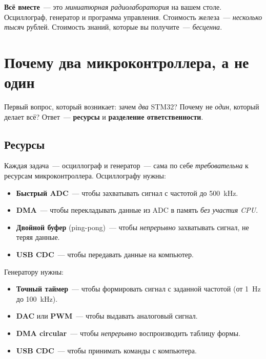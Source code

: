 \begin{keybox}
\textbf{Всё вместе}~--- это \emph{миниатюрная радиолаборатория}
на вашем столе. Осциллограф, генератор и программа
управления. Стоимость железа~--- \emph{несколько тысяч}
рублей. Стоимость знаний, которые вы получите~--- \emph{бесценна}.
\end{keybox}

\section{Почему два микроконтроллера, а не один}
\label{sec:intro-two-mcu}

Первый вопрос, который возникает: зачем \emph{два} STM32?
Почему не \emph{один}, который делает всё? Ответ~---
\textbf{ресурсы} и \textbf{разделение ответственности}.

\subsection{Ресурсы}

Каждая задача~--- осциллограф и генератор~---
сама по себе \emph{требовательна} к ресурсам микроконтроллера.
Осциллографу нужны:

\begin{itemize}
    \item \textbf{Быстрый ADC}~--- чтобы захватывать сигнал
          с частотой до \SI{500}{\kilo\hertz}.
    \item \textbf{DMA}~--- чтобы перекладывать данные из ADC
          в память \emph{без участия CPU}.
    \item \textbf{Двойной буфер} (ping-pong)~--- чтобы
          \emph{непрерывно} захватывать сигнал, не теряя данные.
    \item \textbf{USB CDC}~--- чтобы передавать данные
          на компьютер.
\end{itemize}

Генератору нужны:

\begin{itemize}
    \item \textbf{Точный таймер}~--- чтобы формировать сигнал
          с заданной частотой (от \SI{1}{\hertz} до \SI{100}{\kilo\hertz}).
    \item \textbf{DAC} или \textbf{PWM}~--- чтобы выдавать
          аналоговый сигнал.
    \item \textbf{DMA circular}~--- чтобы \emph{непрерывно}
          воспроизводить таблицу формы.
    \item \textbf{USB CDC}~--- чтобы принимать команды
          с компьютера.
\end{itemize}

